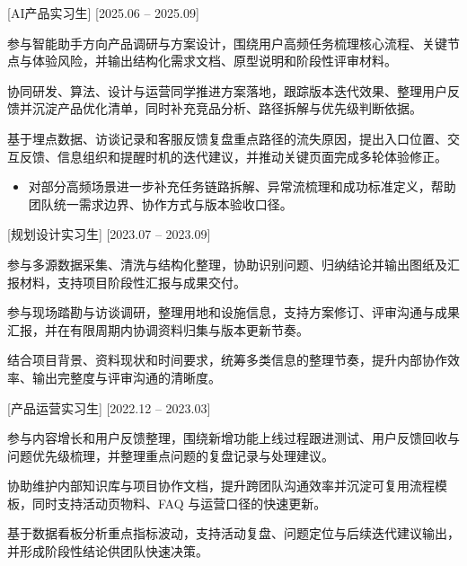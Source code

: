 \documentclass{resume}
\begin{document}
  [AI产品实习生]
  [2025.06 -- 2025.09]

\begin{ResumeCompactList}
  \item 参与智能助手方向产品调研与方案设计，围绕用户高频任务梳理核心流程、关键节点与体验风险，并输出结构化需求文档、原型说明和阶段性评审材料。
  \item 协同研发、算法、设计与运营同学推进方案落地，跟踪版本迭代效果、整理用户反馈并沉淀产品优化清单，同时补充竞品分析、路径拆解与优先级判断依据。
  \item 基于埋点数据、访谈记录和客服反馈复盘重点路径的流失原因，提出入口位置、交互反馈、信息组织和提醒时机的迭代建议，并推动关键页面完成多轮体验修正。
    \begin{itemize}
      \item 对部分高频场景进一步补充任务链路拆解、异常流梳理和成功标准定义，帮助团队统一需求边界、协作方式与版本验收口径。
    \end{itemize}
\end{ResumeCompactList}

  [规划设计实习生]
  [2023.07 -- 2023.09]

\begin{ResumeCompactList}
  \item 参与多源数据采集、清洗与结构化整理，协助识别问题、归纳结论并输出图纸及汇报材料，支持项目阶段性汇报与成果交付。
  \item 参与现场踏勘与访谈调研，整理用地和设施信息，支持方案修订、评审沟通与成果汇报，并在有限周期内协调资料归集与版本更新节奏。
  \item 结合项目背景、资料现状和时间要求，统筹多类信息的整理节奏，提升内部协作效率、输出完整度与评审沟通的清晰度。
\end{ResumeCompactList}

  [产品运营实习生]
  [2022.12 -- 2023.03]

\begin{ResumeCompactList}
  \item 参与内容增长和用户反馈整理，围绕新增功能上线过程跟进测试、用户反馈回收与问题优先级梳理，并整理重点问题的复盘记录与处理建议。
  \item 协助维护内部知识库与项目协作文档，提升跨团队沟通效率并沉淀可复用流程模板，同时支持活动页物料、FAQ 与运营口径的快速更新。
  \item 基于数据看板分析重点指标波动，支持活动复盘、问题定位与后续迭代建议输出，并形成阶段性结论供团队快速决策。
\end{ResumeCompactList}
\end{document}
